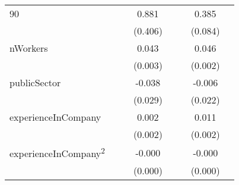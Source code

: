 \begin{longtable}{l*{3}{c}|l*{3}{c}}
	90                  &                     &                     &       0.881\sym{**} &                     &                     &       0.385\sym{***}\\
	&                     &                     &     (0.406)         &                     &                     &     (0.084)         \\
	nWorkers            &                     &                     &       0.043\sym{***}&                     &                     &       0.046\sym{***}\\
	&                     &                     &     (0.003)         &                     &                     &     (0.002)         \\
	publicSector      &                     &                     &      -0.038         &                     &                     &      -0.006         \\
	&                     &                     &     (0.029)         &                     &                     &     (0.022)         \\
	experienceInCompany &                     &                     &       0.002         &                     &                     &       0.011\sym{***}\\
	&                     &                     &     (0.002)         &                     &                     &     (0.002)         \\
	experienceInCompany\textsuperscript{2} &                     &                     &      -0.000         &                     &                     &      -0.000\sym{***}\\
	&                     &                     &     (0.000)         &                     &                     &     (0.000)         \\
	

\end{longtable}
